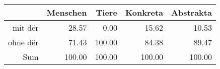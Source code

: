 \begin{tabular}{rrrrr}
  \hline
 & Menschen & Tiere & Konkreta & Abstrakta \\ 
  \hline
mit dër & 28.57 & 0.00 & 15.62 & 10.53 \\ 
  ohne dër & 71.43 & 100.00 & 84.38 & 89.47 \\ 
  Sum & 100.00 & 100.00 & 100.00 & 100.00 \\ 
   \hline
\end{tabular}
